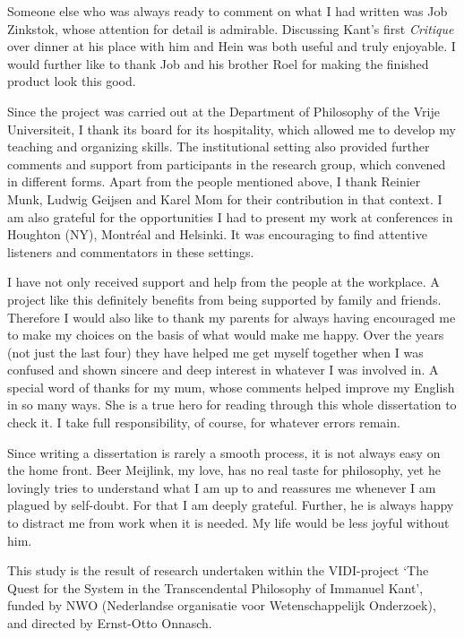 Someone else who was always ready to comment on what I had written was Job Zinkstok, whose attention for detail is admirable. Discussing Kant's first \textit{Critique} over dinner at his place with him and Hein was both useful and truly enjoyable. I would further like to thank Job and his brother Roel for making the finished product look this good. 

Since the project was carried out at the Department of Philosophy of the Vrije Universiteit, I thank its board for its hospitality, which allowed me to develop my teaching and organizing skills. The institutional setting also provided further comments and support from participants in the research group, which convened in different forms. Apart from the people mentioned above, I thank Reinier Munk, Ludwig Geijsen and Karel Mom for their contribution in that context. I am also grateful for the opportunities I had to present my work at conferences in Houghton (NY), Montr\'{e}al and Helsinki. It was encouraging to find attentive listeners and commentators in these settings. 

 I have not only received support and help from the people at the workplace. A project like this definitely benefits from being supported by family and friends. Therefore I would also like to thank my parents for always having encouraged me to make my choices on the basis of what would make me happy. Over the years (not just the last four) they have helped me get myself together when I was confused and shown sincere and deep interest in whatever I was involved in. A special word of thanks for my mum, whose comments helped improve my English in so many ways. She is a true hero for reading through this whole dissertation to check it. I take full responsibility, of course, for whatever errors remain. 

 Since writing a dissertation is rarely a smooth process, it is not always easy on the home front. Beer Meijlink, my love, has no real taste for philosophy, yet he lovingly tries to understand what I am up to and reassures me whenever I am plagued by self{-}doubt. For that I am deeply grateful. Further, he is always happy to distract me from work when it is needed. My life would be less joyful without him. 

This study is the result of research undertaken within the VIDI{-}project `The Quest for the System in the Transcendental Philosophy of Immanuel Kant', funded by NWO (Nederlandse organisatie voor Wetenschappelijk Onderzoek), and directed by Ernst{-}Otto Onnasch. 


